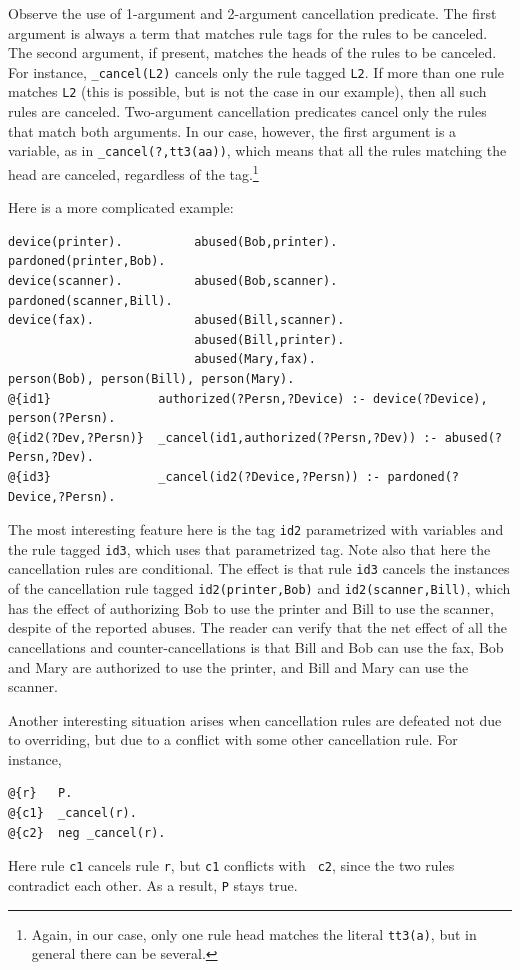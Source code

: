 \documentclass[11pt]{article}
\begin{document}
Observe the use of 1-argument and 2-argument cancellation predicate.
The first argument is always a term that matches rule tags for the rules
to be canceled. The second
argument, if present, matches the heads of the rules to be canceled. For
instance, {\tt \_cancel(L2)} cancels only the rule tagged {\tt L2}. If more
than one rule matches {\tt L2} (this is possible, but is not the case in
our example), then all such rules are canceled. Two-argument cancellation
predicates cancel only the rules that match both arguments. In our case,
however, the first argument is a variable, as in {\tt \_cancel(?,tt3(aa))},
which means that all the rules matching the head are canceled, regardless
of the tag.\footnote{
  Again, in our case, only one rule head matches the literal {\tt tt3(a)},
  but in general there can be several.
}

Here is a more complicated example:
\begin{verbatim}
device(printer).          abused(Bob,printer).       pardoned(printer,Bob).
device(scanner).          abused(Bob,scanner).       pardoned(scanner,Bill).
device(fax).              abused(Bill,scanner).
                          abused(Bill,printer).
                          abused(Mary,fax).
person(Bob), person(Bill), person(Mary).
@{id1}               authorized(?Persn,?Device) :- device(?Device), person(?Persn).
@{id2(?Dev,?Persn)}  _cancel(id1,authorized(?Persn,?Dev)) :- abused(?Persn,?Dev).
@{id3}               _cancel(id2(?Device,?Persn)) :- pardoned(?Device,?Persn).
\end{verbatim}
The most interesting feature here is the tag {\tt id2} parametrized with
variables and the rule tagged {\tt id3}, which uses that parametrized
tag. Note also that here the cancellation rules are conditional.
The effect is that rule {\tt id3} cancels the instances 
of the cancellation rule tagged {\tt id2(printer,Bob)} and
{\tt id2(scanner,Bill)}, which has the effect of authorizing Bob to use the
printer and Bill to use the scanner, despite of the reported abuses.  
The reader can verify that the net effect of all the cancellations and
counter-cancellations is that Bill and Bob can use the fax, Bob and Mary
are authorized to use the printer, and Bill and Mary can use the scanner.

Another interesting situation arises when cancellation rules are defeated
not due to overriding, but due to a conflict with some other cancellation
rule. For instance,
\begin{verbatim}
@{r}   P.
@{c1}  _cancel(r).
@{c2}  neg _cancel(r).
\end{verbatim}
Here rule {\tt c1} cancels rule {\tt r}, but {\tt c1} conflicts with {\tt
  c2}, since the two rules contradict each other. As a result, {\tt P}      
stays true.
\end{document}
